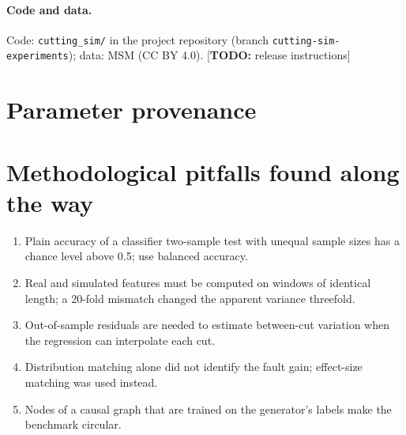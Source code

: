 \documentclass[11pt]{article}
\newcommand{\todo}[1]{{\color{red}[\textbf{TODO:} #1]}}
\begin{document}
\paragraph{Code and data.}
Code: \texttt{cutting\_sim/} in the project repository (branch \texttt{cutting-sim-experiments}); data: MSM \citep{kim2026msm} (CC BY 4.0). \todo{release instructions}




\appendix
\section{Parameter provenance}\label{app:registry}
\begin{table}[h]\centering\small

\caption{Every simulator parameter, its tier (fixed / learned / assumed) and verification status.}
\end{table}

\section{Methodological pitfalls found along the way}
\begin{enumerate}
\item Plain accuracy of a classifier two-sample test with unequal sample sizes has a chance level above 0.5; use balanced accuracy.
\item Real and simulated features must be computed on windows of identical length; a 20-fold mismatch changed the apparent variance threefold.
\item Out-of-sample residuals are needed to estimate between-cut variation when the regression can interpolate each cut.
\item Distribution matching alone did not identify the fault gain; effect-size matching was used instead.
\item Nodes of a causal graph that are trained on the generator's labels make the benchmark circular.
\end{enumerate}
\end{document}
